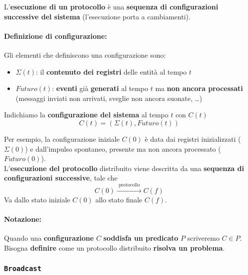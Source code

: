 L'\textbf{esecuzione di un protocollo} è una \textbf{sequenza di configurazioni successive del sistema} (l'esecuzione porta a cambiamenti).\\

\paragraph{Definizione di configurazione:} Gli elementi che definiscono una configurazione sono:
\begin{itemize}
	\item $\Sigma (t)$: il \textbf{contenuto dei registri} delle entità al tempo $t$
	\item $Futuro(t)$: \textbf{eventi} già \textbf{generati} al tempo $t$ ma \textbf{non ancora processati} (messaggi inviati non arrivati, sveglie non ancora suonate, \dots)
\end{itemize}

Indichiamo la \textbf{configurazione del sistema} al tempo $t$ con $C(t)$
$$ C(t) = (\Sigma(t), Futuro(t))$$

Per esempio, la configurazione iniziale $C(0)$ è data dai registri inizializzati ($\Sigma(0)$) e dall'impulso spontaneo, presente ma non ancora processato ($Futuro(0)$).\\

L'\textbf{esecuzione del protocollo} distribuito viene descritta da una \textbf{sequenza di configurazioni successive}, tale che
$$ C(0) \xrightarrow{\text{ protocollo }} C(f)$$
Va dallo stato iniziale $C(0)$ allo stato finale $C(f)$.\\

\newpage

\paragraph{Notazione:} Quando una \textbf{configurazione} $C$ \textbf{soddisfa un predicato} $P$ scriveremo $C \in P$.\\

Bisogna \textbf{definire} come un protocollo distribuito \textbf{risolva un problema}.\\

\subsubsection{\texttt{Broadcast}}

